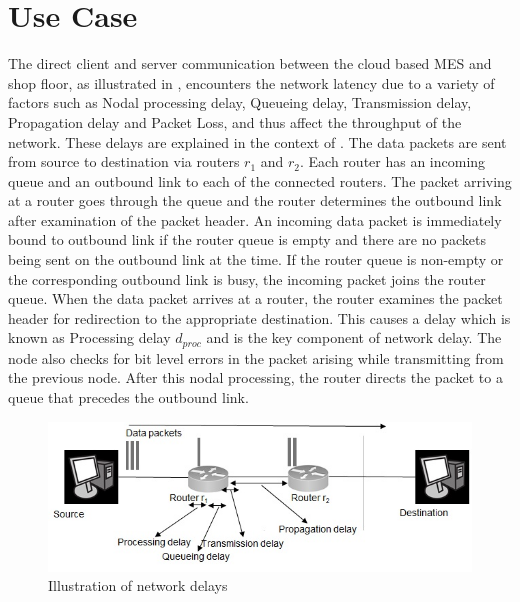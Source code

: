\documentclass[10pt,conference,compsocconf]{IEEEtran}
\begin{document}


\section{Use Case} \label{Use_Case}

The direct client and server communication between the cloud based MES and shop floor, as illustrated in , encounters the network latency due to a variety of factors such as Nodal processing delay, Queueing delay, Transmission delay, Propagation delay and Packet Loss, and thus affect the throughput of the network. These delays are explained in the context of . The data packets are sent from source to destination via routers $r_1$ and $r_2$. Each router has an incoming queue and an outbound link to each of the connected routers. The packet arriving at a router goes through the queue and the router determines the outbound link after examination of the packet header. An incoming data packet is immediately bound to outbound link if the router queue is empty and there are no packets being sent on the outbound link at the time. If the router queue is non-empty or the corresponding outbound link is busy, the incoming packet joins the router queue. When the data packet arrives at a router, the router examines the packet header for redirection to the appropriate destination. This causes a delay which is known as Processing delay $d_{proc}$ and is the key component of network delay.  The node also checks for bit level errors in the packet arising while transmitting from the previous node. After this nodal processing, the router directs the packet to a queue that precedes the outbound link. 

\begin{figure} [h]
\centering
\includegraphics [scale=0.5]{"Figures/NetworkLatency"}
\caption{Illustration of network delays}
\label{fig:NetworkLatency}
\end{figure}
\end{document}
